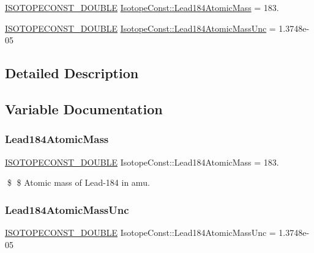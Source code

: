 \begin{DoxyCompactItemize}
\item 
\mbox{\hyperlink{group___isotope_const-_macros_ga8f45a7272ce02c0b4c65c44636ed719a}{I\+S\+O\+T\+O\+P\+E\+C\+O\+N\+S\+T\+\_\+\+D\+O\+U\+B\+LE}} \mbox{\hyperlink{group___isotope_const-_lead-_pb184_gae2fa2643f1c121b185aea24ef52b68e3}{Isotope\+Const\+::\+Lead184\+Atomic\+Mass}} = 183.
\item 
\mbox{\hyperlink{group___isotope_const-_macros_ga8f45a7272ce02c0b4c65c44636ed719a}{I\+S\+O\+T\+O\+P\+E\+C\+O\+N\+S\+T\+\_\+\+D\+O\+U\+B\+LE}} \mbox{\hyperlink{group___isotope_const-_lead-_pb184_ga63d6e0894227b161804cec78c50a9a14}{Isotope\+Const\+::\+Lead184\+Atomic\+Mass\+Unc}} = 1.\+3748e-\/05
\end{DoxyCompactItemize}


\subsection{Detailed Description}


\subsection{Variable Documentation}
\mbox{\label{group___isotope_const-_lead-_pb184_gae2fa2643f1c121b185aea24ef52b68e3}} 
\subsubsection{\texorpdfstring{Lead184\+Atomic\+Mass}{Lead184AtomicMass}}
{\footnotesize\ttfamily \mbox{\hyperlink{group___isotope_const-_macros_ga8f45a7272ce02c0b4c65c44636ed719a}{I\+S\+O\+T\+O\+P\+E\+C\+O\+N\+S\+T\+\_\+\+D\+O\+U\+B\+LE}} Isotope\+Const\+::\+Lead184\+Atomic\+Mass = 183.}

\$ \$ Atomic mass of Lead-\/184 in amu. \mbox{\label{group___isotope_const-_lead-_pb184_ga63d6e0894227b161804cec78c50a9a14}} 
\subsubsection{\texorpdfstring{Lead184\+Atomic\+Mass\+Unc}{Lead184AtomicMassUnc}}
{\footnotesize\ttfamily \mbox{\hyperlink{group___isotope_const-_macros_ga8f45a7272ce02c0b4c65c44636ed719a}{I\+S\+O\+T\+O\+P\+E\+C\+O\+N\+S\+T\+\_\+\+D\+O\+U\+B\+LE}} Isotope\+Const\+::\+Lead184\+Atomic\+Mass\+Unc = 1.\+3748e-\/05}

